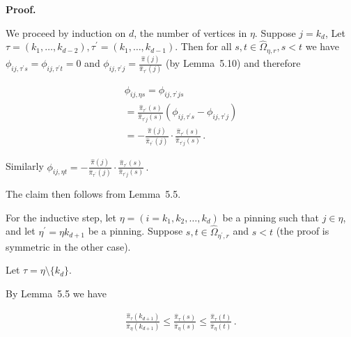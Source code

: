 \documentclass[10pt,a4paper]{article}
\begin{document}



\par\medskip\noindent\textbf{Proof.}\par



We proceed by induction on $d$, the number of vertices in $\eta$. Suppose $j=k_{d}$, Let $\tau=(k_{1},\dots,k_{d-2}),\tau^{\prime}=(k_{1},\dots,k_{d-1}).$ Then for all $s,t\in\hat{\Omega}_{\eta,r},s<t$ we have $\phi_{ij,\tau^{\prime}s}=\phi_{ij,\tau^{\prime}t}=0$ and $\phi_{ij,\tau^{\prime}j}=\frac{\hat{\pi}(j)}{\hat{\pi}_{\tau^{\prime}}(j)}$ (by Lemma 5.10) and therefore\par


\[\begin{gathered}
\displaystyle\phi_{ij,\eta s} \displaystyle=\phi_{ij,\tau^{\prime}js} \\
\displaystyle=\frac{\hat{\pi}_{\tau^{\prime}}(s)}{\hat{\pi}_{\tau^{\prime}j}(s)}(\phi_{ij,\tau^{\prime}s}-\phi_{ij,\tau^{\prime}j}) \\
\displaystyle=-\frac{\hat{\pi}(j)}{\hat{\pi}_{\tau^{\prime}}(j)}\cdot\frac{\hat{\pi}_{\tau^{\prime}}(s)}{\hat{\pi}_{\tau^{\prime}j}(s)}\,.
\end{gathered}\]




Similarly $\phi_{ij,\eta t}=-\frac{\hat{\pi}(j)}{\hat{\pi}_{\tau^{\prime}}(j)}\cdot\frac{\hat{\pi}_{\tau^{\prime}}(s)}{\hat{\pi}_{\tau^{\prime}j}(s)}\,.$\par




The claim then follows from Lemma 5.5.\par




For the inductive step, let $\eta=(i=k_{1},k_{2},\dots,k_{d})$ be a pinning such that $j\in\eta$, and let $\eta^{\prime}=\eta k_{d+1}$ be a pinning. Suppose $s,t\in\hat{\Omega}_{\eta^{\prime},r}$ and $s<t$ (the proof is symmetric in the other case).\par




Let $\tau=\eta\setminus\{k_{d}\}$.\par




By Lemma 5.5 we have\par


\[\begin{gathered}
\frac{\hat{\pi}_{\tau}(k_{d+1})}{\hat{\pi}_{\eta}(k_{d+1})}\leq\frac{\hat{\pi}_{\tau}(s)}{\hat{\pi}_{\eta}(s)}\leq\frac{\hat{\pi}_{\tau}(t)}{\hat{\pi}_{\eta}(t)}\,.
\end{gathered}\]
\end{document}
